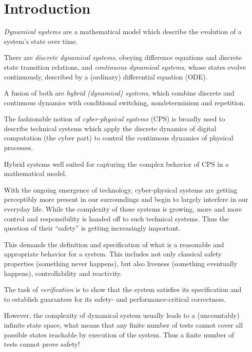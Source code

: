 \chapter{Introduction}

    \emph{Dynamical systems} are a mathematical model which describe the evolution of a system's
    state over time.
    
    There are \emph{discrete dynamical systems}, obeying difference equations and discrete state transition relations,
    and \emph{continuous dynamical systems}, whose states evolve continuously, described by a (ordinary) differential equation (ODE).

    A fusion of both are \emph{hybrid (dynamical) systems}, which combine discrete and continuous dynamics with conditional switching, nondeterminism and repetition.

    
    The fashionable notion of \emph{cyber-physical systems} (CPS) is broadly used to describe technical systems which apply the discrete dynamics of digital computation (the cyber part) to control the continuous dynamics of physical processes.

    Hybrid systems well suited for capturing the complex behavior of CPS in a mathematical model.

    With the ongoing emergence of technology, cyber-physical systems are getting perceptibly more present in our surroundings and begin to largely interfere in our everyday life.
    While the complexity of these systems is growing, more and more control and responsibility is handed off to such technical systems.
    Thus the question of their ``safety'' is getting increasingly important.
    
    This demands the definition and specification of what is a reasonable and appropriate behavior for a system.
    This includes not only classical safety properties (something never happens), but also liveness (something eventually happens), controllability and reactivity.

    The task of \emph{verification} is to show that the system satisfies its specification and to establish guarantees for its safety- and performance-critical correctness.

    However, the complexity of dynamical system usually leads to a (uncountably) infinite state space, what means that any finite number of tests cannot cover all possible states reachable by execution of the system. Thus a finite number of tests cannot prove safety!
    
